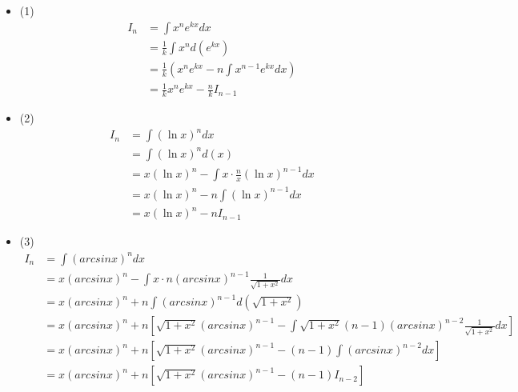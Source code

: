\documentclass{article}
\begin{document}
\begin{itemize}
  \item (1)
        \begin{align*}
          I_n & = \int x^n e^{kx} dx                                  \\
              & = \frac{1}{k} \int x^n  d(e^{kx})                     \\
              & = \frac{1}{k} (x^n e^{kx} - n \int x^{n-1} e^{kx} dx) \\
              & = \frac{1}{k} x^n e^{kx} - \frac{n}{k} I_{n-1}
        \end{align*}

  \item (2)
        \begin{align*}
          I_n & = \int (\ln x)^n dx                                       \\
              & = \int (\ln x)^n d(x)                                     \\
              & = x (\ln x)^n - \int x \cdot \frac{n}{x} (\ln x)^{n-1} dx \\
              & = x (\ln x)^n - n \int (\ln x)^{n-1} dx                   \\
              & = x (\ln x)^n - n I_{n - 1}
        \end{align*}
  \item (3)
        \begin{align*}
          I_n & = \int (arcsinx)^n dx                                                                                                                          \\
              & = x (arcsinx)^n - \int x \cdot n (arcsinx)^{n - 1} \frac{1}{\sqrt{1 + x^2}} dx                                                                 \\
              & = x (arcsinx)^n + n \int (arcsinx)^{n - 1} d(\sqrt{1 + x^2})                                                                                   \\
              & = x (arcsinx)^n + n \left[ \sqrt{1 + x^2}(arcsinx)^{n - 1} - \int \sqrt{1 + x^2} (n - 1) (arcsinx)^{n - 2} \frac{1}{\sqrt{1 + x^2}} dx \right] \\
              & = x (arcsinx)^n + n \left[ \sqrt{1 + x^2}(arcsinx)^{n - 1} - (n - 1) \int (arcsinx)^{n - 2} dx \right]                                         \\
              & = x (arcsinx)^n + n \left[ \sqrt{1 + x^2}(arcsinx)^{n - 1} - (n - 1) I_{n - 2} \right]                                                         \\

\end{align*}
\end{itemize}
\end{document}
